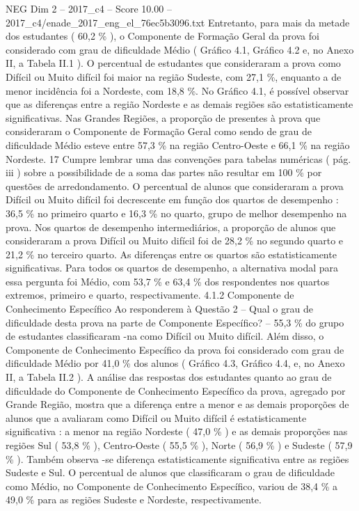 \begin{textsample}{NEG Dim 2 – 2017\_c4 – Score 10.00 – 2017\_c4/enade\_2017\_eng\_el\_76ec5b3096.txt}
Entretanto, para mais da metade dos estudantes ( 60,2 \% ), o Componente de Formação Geral da prova foi considerado com grau de dificuldade Médio ( Gráfico 4.1, Gráfico 4.2 e, no Anexo II, a Tabela II.1 ).
O percentual de estudantes que consideraram a prova como Difícil ou Muito difícil foi maior na região Sudeste, com 27,1 \%, enquanto a de menor incidência foi a Nordeste, com 18,8 \%.
No Gráfico 4.1, é possível observar que as diferenças entre a região Nordeste e as demais regiões são estatisticamente significativas.
Nas Grandes Regiões, a proporção de presentes à prova que consideraram o Componente de Formação Geral como sendo de grau de dificuldade Médio esteve entre 57,3 \% na região Centro-Oeste e 66,1 \% na região Nordeste. 17 Cumpre lembrar uma das convenções para tabelas numéricas ( pág. iii ) sobre a possibilidade de a soma das partes não resultar em 100 \% por questões de arredondamento.
O percentual de alunos que consideraram a prova Difícil ou Muito difícil foi decrescente em função dos quartos de desempenho : 36,5 \% no primeiro quarto e 16,3 \% no quarto, grupo de melhor desempenho na prova.
Nos quartos de desempenho intermediários, a proporção de alunos que consideraram a prova Difícil ou Muito difícil foi de 28,2 \% no segundo quarto e 21,2 \% no terceiro quarto.
As diferenças entre os quartos são estatisticamente significativas.
Para todos os quartos de desempenho, a alternativa modal para essa pergunta foi Médio, com 53,7 \% e 63,4 \% dos respondentes nos quartos extremos, primeiro e quarto, respectivamente. 4.1.2 Componente de Conhecimento Específico Ao responderem à Questão 2 – Qual o grau de dificuldade desta prova na parte de Componente Específico? – 55,3 \% do grupo de estudantes classificaram -na como Difícil ou Muito difícil.
Além disso, o Componente de Conhecimento Específico da prova foi considerado com grau de dificuldade Médio por 41,0 \% dos alunos ( Gráfico 4.3, Gráfico 4.4, e, no Anexo II, a Tabela II.2 ).
A análise das respostas dos estudantes quanto ao grau de dificuldade do Componente de Conhecimento Específico da prova, agregado por Grande Região, mostra que a diferença entre a menor e as demais proporções de alunos que a avaliaram como Difícil ou Muito difícil é estatisticamente significativa : a menor na região Nordeste ( 47,0 \% ) e as demais proporções nas regiões Sul ( 53,8 \% ), Centro-Oeste ( 55,5 \% ), Norte ( 56,9 \% ) e Sudeste ( 57,9 \% ).
Também observa -se diferença estatisticamente significativa entre as regiões Sudeste e Sul.
O percentual de alunos que classificaram o grau de dificuldade como Médio, no Componente de Conhecimento Específico, variou de 38,4 \% a 49,0 \% para as regiões Sudeste e Nordeste, respectivamente.

\end{textsample}
